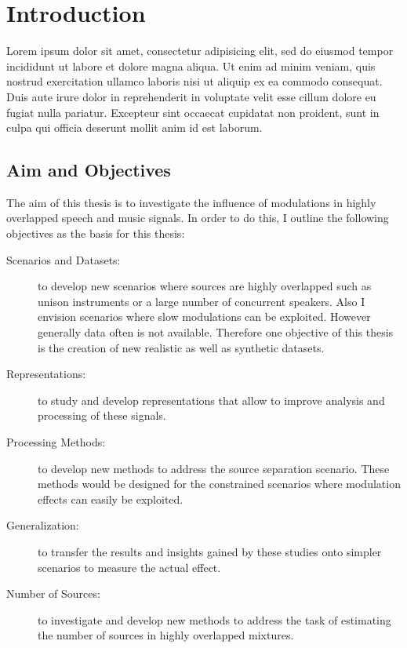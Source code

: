 \chapter{Introduction}\label{ch:introduction}

Lorem ipsum dolor sit amet, consectetur adipisicing elit, sed do eiusmod tempor incididunt ut labore et dolore magna aliqua. Ut enim ad minim veniam, quis nostrud exercitation ullamco laboris nisi ut aliquip ex ea commodo consequat. Duis aute irure dolor in reprehenderit in voluptate velit esse cillum dolore eu fugiat nulla pariatur. Excepteur sint occaecat cupidatat non proident, sunt in culpa qui officia deserunt mollit anim id est laborum.


\section{Aim and Objectives}

The aim of this thesis is to investigate the influence of modulations in highly overlapped speech and music signals.
In order to do this, I outline the following objectives as the basis for this thesis:

\begin{description}
  \item[Scenarios and Datasets:] to develop new scenarios where sources are highly overlapped such as unison instruments or a large number of concurrent speakers. Also I envision scenarios where slow modulations can be exploited. However generally data often is not available. Therefore one objective of this thesis is the creation          of new realistic as well as synthetic datasets.
  \item[Representations:] 
    to study and develop representations that allow to improve analysis and processing of these signals.
  \item[Processing Methods:] to develop new methods to address the source separation scenario. These methods would be designed for the constrained scenarios where modulation effects can easily be exploited.
  \item[Generalization:] to transfer the results and insights gained by these
    studies onto simpler scenarios to measure the actual effect.
  \item[Number of Sources:] to investigate and develop new methods to address the task of estimating the number of sources in highly overlapped mixtures.
\end{description}


